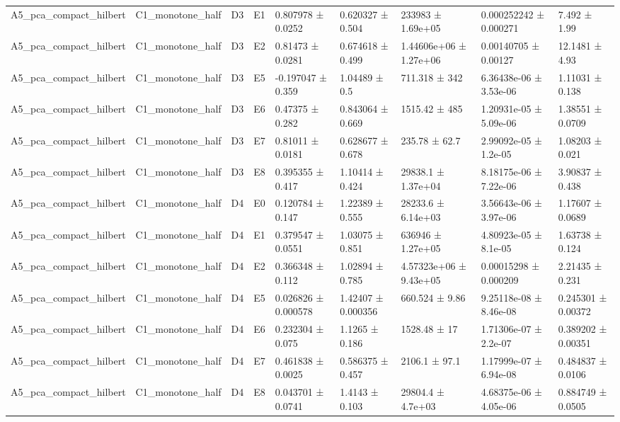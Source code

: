 \begin{table}
\begin{tabular}{lllllllll}
A5\_pca\_compact\_hilbert & C1\_monotone\_half & D3 & E1 & 0.807978 ± 0.0252 & 0.620327 ± 0.504 & 233983 ± 1.69e+05 & 0.000252242 ± 0.000271 & 7.492 ± 1.99 \\
A5\_pca\_compact\_hilbert & C1\_monotone\_half & D3 & E2 & 0.81473 ± 0.0281 & 0.674618 ± 0.499 & 1.44606e+06 ± 1.27e+06 & 0.00140705 ± 0.00127 & 12.1481 ± 4.93 \\
A5\_pca\_compact\_hilbert & C1\_monotone\_half & D3 & E5 & -0.197047 ± 0.359 & 1.04489 ± 0.5 & 711.318 ± 342 & 6.36438e-06 ± 3.53e-06 & 1.11031 ± 0.138 \\
A5\_pca\_compact\_hilbert & C1\_monotone\_half & D3 & E6 & 0.47375 ± 0.282 & 0.843064 ± 0.669 & 1515.42 ± 485 & 1.20931e-05 ± 5.09e-06 & 1.38551 ± 0.0709 \\
A5\_pca\_compact\_hilbert & C1\_monotone\_half & D3 & E7 & 0.81011 ± 0.0181 & 0.628677 ± 0.678 & 235.78 ± 62.7 & 2.99092e-05 ± 1.2e-05 & 1.08203 ± 0.021 \\
A5\_pca\_compact\_hilbert & C1\_monotone\_half & D3 & E8 & 0.395355 ± 0.417 & 1.10414 ± 0.424 & 29838.1 ± 1.37e+04 & 8.18175e-06 ± 7.22e-06 & 3.90837 ± 0.438 \\
A5\_pca\_compact\_hilbert & C1\_monotone\_half & D4 & E0 & 0.120784 ± 0.147 & 1.22389 ± 0.555 & 28233.6 ± 6.14e+03 & 3.56643e-06 ± 3.97e-06 & 1.17607 ± 0.0689 \\
A5\_pca\_compact\_hilbert & C1\_monotone\_half & D4 & E1 & 0.379547 ± 0.0551 & 1.03075 ± 0.851 & 636946 ± 1.27e+05 & 4.80923e-05 ± 8.1e-05 & 1.63738 ± 0.124 \\
A5\_pca\_compact\_hilbert & C1\_monotone\_half & D4 & E2 & 0.366348 ± 0.112 & 1.02894 ± 0.785 & 4.57323e+06 ± 9.43e+05 & 0.00015298 ± 0.000209 & 2.21435 ± 0.231 \\
A5\_pca\_compact\_hilbert & C1\_monotone\_half & D4 & E5 & 0.026826 ± 0.000578 & 1.42407 ± 0.000356 & 660.524 ± 9.86 & 9.25118e-08 ± 8.46e-08 & 0.245301 ± 0.00372 \\
A5\_pca\_compact\_hilbert & C1\_monotone\_half & D4 & E6 & 0.232304 ± 0.075 & 1.1265 ± 0.186 & 1528.48 ± 17 & 1.71306e-07 ± 2.2e-07 & 0.389202 ± 0.00351 \\
A5\_pca\_compact\_hilbert & C1\_monotone\_half & D4 & E7 & 0.461838 ± 0.0025 & 0.586375 ± 0.457 & 2106.1 ± 97.1 & 1.17999e-07 ± 6.94e-08 & 0.484837 ± 0.0106 \\
A5\_pca\_compact\_hilbert & C1\_monotone\_half & D4 & E8 & 0.043701 ± 0.0741 & 1.4143 ± 0.103 & 29804.4 ± 4.7e+03 & 4.68375e-06 ± 4.05e-06 & 0.884749 ± 0.0505 \\

\end{tabular}
\end{table}
